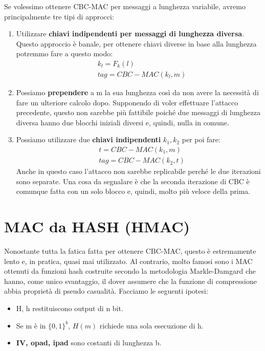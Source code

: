 Se volessimo ottenere CBC-MAC per messaggi a lunghezza variabile, avremo principalmente tre tipi di approcci:
\begin{enumerate}
    \item Utilizzare \textbf{chiavi indipendenti per messaggi di lunghezza diversa}. Questo approccio è banale, per ottenere chiavi diverse in base alla lunghezza potremmo fare a questo modo:
        \begin{align*}
            &k_l=F_k(l)\\
            &tag=CBC-MAC(k_l,m)
        \end{align*}
    \item Possiamo \textbf{prependere} a m la sua lunghezza così da non avere la necessità di fare un ulteriore calcolo dopo. Supponendo di voler effettuare l'attacco precedente, questo non sarebbe più fattibile poiché due messaggi di lunghezza diversa hanno due blocchi iniziali diversi e, quindi, nulla in comune.
    \item Possiamo utilizzare due \textbf{chiavi indipendenti} $k_1,k_2$ per poi fare:
        \begin{align*}
            &t=CBC-MAC(k_1, m)\\
            &tag=CBC-MAC(k_2, t)
        \end{align*}
    Anche in questo caso l'attacco non sarebbe replicabile perché le due iterazioni sono separate. Una cosa da segnalare è che la seconda iterazione di CBC è comunque fatta con un solo blocco e, quindi, molto più veloce della prima.
\end{enumerate}
\section{MAC da HASH (HMAC)}
Nonostante tutta la fatica fatta per ottenere CBC-MAC, questo è estremamente lento e, in pratica, quasi mai utilizzato. Al contrario, molto famosi sono i MAC ottenuti da funzioni hash costruite secondo la metodologia Markle-Damgard che hanno, come unico svantaggio, il dover assumere che la funzione di compressione abbia proprietà di pseudo casualità. 
Facciamo le seguenti ipotesi:
\begin{itemize}
    \item H, h restituiscono output di n bit.
    \item Se m è in $\{0,1\}^b$, $H(m)$ richiede una sola esecuzione di h.
    \item \textbf{IV, opad, ipad} sono costanti di lunghezza b. 
\end{itemize}

